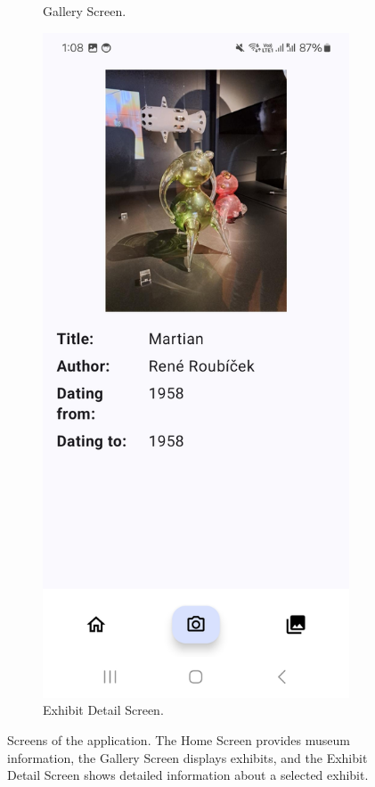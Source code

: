 \begin{figure}[h]
\begin{subfigure}[b]{0.3\textwidth}
        \caption{Gallery Screen.}
    \end{subfigure}
    \hfill
    \begin{subfigure}[b]{0.3\textwidth}
        \centering
        \includegraphics[width=\textwidth]{img/exhibit-screen.jpg}
        \caption{Exhibit Detail Screen.}
    \end{subfigure}

    \caption{Screens of the application. The Home Screen provides museum information, the Gallery Screen displays exhibits, and the Exhibit Detail Screen shows detailed information about a selected exhibit.}\label{fig:app_screens_1}
\end{figure}

